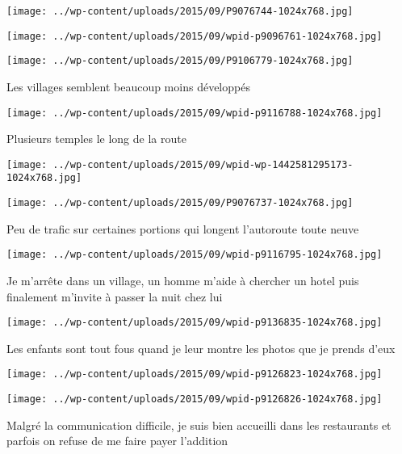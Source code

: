 \centerline{\texttt{[image: ../wp-content/uploads/2015/09/P9076744-1024x768.jpg]} } 
 \newline
 \newline
\centerline{\texttt{[image: ../wp-content/uploads/2015/09/wpid-p9096761-1024x768.jpg]} } 
 \newline
 \newline
\centerline{\texttt{[image: ../wp-content/uploads/2015/09/P9106779-1024x768.jpg]} } 
 \newline
 Les villages semblent beaucoup moins développés \newline
 \newline
\centerline{\texttt{[image: ../wp-content/uploads/2015/09/wpid-p9116788-1024x768.jpg]} } 
 \newline
 Plusieurs temples le long de la route \newline
 \newline
\centerline{\texttt{[image: ../wp-content/uploads/2015/09/wpid-wp-1442581295173-1024x768.jpg]} } 
 \newline
 \newline
\centerline{\texttt{[image: ../wp-content/uploads/2015/09/P9076737-1024x768.jpg]} } 
 \newline
 Peu de trafic sur certaines portions qui longent l'autoroute toute neuve \newline
 \newline
\centerline{\texttt{[image: ../wp-content/uploads/2015/09/wpid-p9116795-1024x768.jpg]} } 
 \newline
 Je m'arrête dans un village, un homme m'aide à chercher un hotel puis finalement m'invite à passer la nuit chez lui \newline
 \newline
\centerline{\texttt{[image: ../wp-content/uploads/2015/09/wpid-p9136835-1024x768.jpg]} } 
 \newline
 Les enfants sont tout fous quand je leur montre les photos que je prends d'eux \newline
 \newline
\centerline{\texttt{[image: ../wp-content/uploads/2015/09/wpid-p9126823-1024x768.jpg]} } 
 \newline
 \newline
\centerline{\texttt{[image: ../wp-content/uploads/2015/09/wpid-p9126826-1024x768.jpg]} } 
 \newline
 Malgré la communication difficile, je suis bien accueilli dans les restaurants et parfois on refuse de me faire payer l'addition \newline

